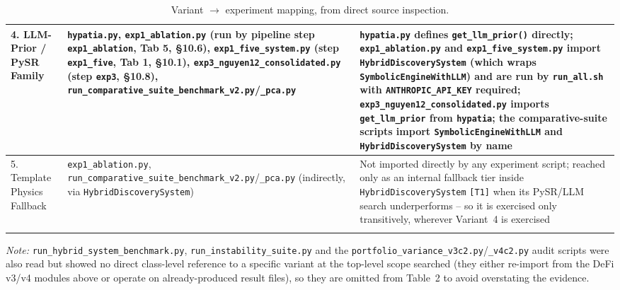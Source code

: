 \documentclass[11pt,a4paper]{article}
\newcommand{\code}[1]{\texttt{\small #1}}
\begin{document}
\begin{longtable}{@{}p{2.6cm}p{6.3cm}p{6.3cm}@{}}
\midrule
4. LLM-Prior / PySR Family &
  \code{hypatia.py}, \code{exp1\_ablation.py} (run by pipeline step \code{exp1\_ablation}, Tab 5, \S10.6), \code{exp1\_five\_system.py} (step \code{exp1\_five}, Tab 1, \S10.1), \code{exp3\_nguyen12\_consolidated.py} (step \code{exp3}, \S10.8), \code{run\_comparative\_suite\_benchmark\_v2.py}/\code{\_pca.py} &
  \code{hypatia.py} defines \code{get\_llm\_prior()} directly; \code{exp1\_ablation.py} and \code{exp1\_five\_system.py} import \code{HybridDiscoverySystem} (which wraps \code{SymbolicEngineWithLLM}) and are run by \code{run\_all.sh} with \code{ANTHROPIC\_API\_KEY} required; \code{exp3\_nguyen12\_consolidated.py} imports \code{get\_llm\_prior} from \code{hypatia}; the comparative-suite scripts import \code{SymbolicEngineWithLLM} and \code{HybridDiscoverySystem} by name \\
\midrule
5. Template Physics Fallback &
  \code{exp1\_ablation.py}, \code{run\_comparative\_suite\_benchmark\_v2.py}/\code{\_pca.py} (indirectly, via \code{HybridDiscoverySystem}) &
  Not imported directly by any experiment script; reached only as an internal fallback tier inside \code{HybridDiscoverySystem} \code{[T1]} when its PySR/LLM search underperforms -- so it is exercised only transitively, wherever Variant~4 is exercised \\
\bottomrule
\caption{Variant $\to$ experiment mapping, from direct source inspection.}
\end{longtable}

\noindent\textit{Note:} \code{run\_hybrid\_system\_benchmark.py}, \code{run\_instability\_suite.py} and the
\code{portfolio\_variance\_v3c2.py}/\code{\_v4c2.py} audit scripts were also read but showed no
direct class-level reference to a specific variant at the top-level scope
searched (they either re-import from the DeFi v3/v4 modules above or operate
on already-produced result files), so they are omitted from Table~2 to avoid
overstating the evidence.
\end{document}
